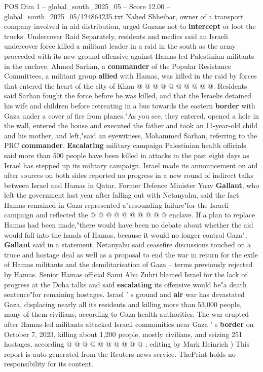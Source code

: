 \begin{textsample}{POS Dim 1 – global\_south\_2025\_05 – Score 12.00 – global\_south\_2025\_05/124864235.txt}
Nahed Shheibar, owner of a transport company involved in aid distribution, urged Gazans not to \textbf{intercept} or loot the trucks.
Undercover Raid Separately, residents and medics said an Israeli undercover force killed a militant leader in a raid in the south as the army proceeded with its new ground offensive against Hamas-led Palestinian militants in the enclave.
Ahmed Sarhan, a \textbf{commander} of the Popular Resistance Committees, a militant group \textbf{allied} with Hamas, was killed in the raid by forces that entered the heart of the city of Khan @ @ @ @ @ @ @ @ @ @.
Residents said Sarhan fought the force before he was killed, and that the Israelis detained his wife and children before retreating in a bus towards the eastern \textbf{border} with Gaza under a cover of fire from planes."As you see, they entered, opened a hole in the wall, entered the house and executed the father and took an 11-year-old child and his mother, and left,"said an eyewitness, Mohammed Sarhan, referring to the PRC \textbf{commander}. \textbf{Escalating} military campaign Palestinian health officials said more than 500 people have been killed in attacks in the past eight days as Israel has stepped up its military campaign.
Israel made its announcement on aid after sources on both sides reported no progress in a new round of indirect talks between Israel and Hamas in Qatar.
Former Defence Minister Yoav \textbf{Gallant}, who left the government last year after falling out with Netanyahu, said the fact Hamas remained in Gaza represented a"resounding failure"for the Israeli campaign and reflected the @ @ @ @ @ @ @ @ @ @ enclave.
If a plan to replace Hamas had been made,"there would have been no debate about whether the aid would fall into the hands of Hamas, because it would no longer control Gaza", \textbf{Gallant} said in a statement.
Netanyahu said ceasefire discussions touched on a truce and hostage deal as well as a proposal to end the war in return for the exile of Hamas militants and the demilitarisation of Gaza -- terms previously rejected by Hamas.
Senior Hamas official Sami Abu Zuhri blamed Israel for the lack of progress at the Doha talks and said \textbf{escalating} its offensive would be"a death sentence"for remaining hostages.
Israel ' s ground and \textbf{air} war has devastated Gaza, displacing nearly all its residents and killing more than 53,000 people, many of them civilians, according to Gaza health authorities.
The war erupted after Hamas-led militants attacked Israeli communities near Gaza ' s \textbf{border} on October 7, 2023, killing about 1,200 people, mostly civilians, and seizing 251 hostages, according @ @ @ @ @ @ @ @ @ @ ; editing by Mark Heinrich ) This report is auto-generated from the Reuters news service.
ThePrint holds no responsibility for its content.

\end{textsample}
